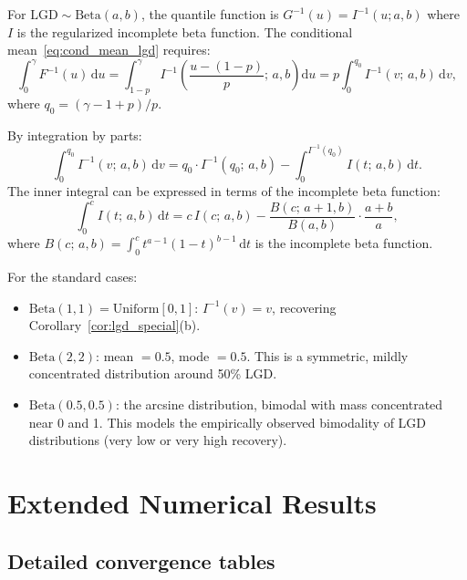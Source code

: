 \documentclass[11pt]{article}
\theoremstyle{definition}
\newcommand{\dd}{\mathrm{d}}
\newcommand{\1}{\mathbf{1}}
\begin{document}
For $\mathrm{LGD} \sim \mathrm{Beta}(a,b)$, the quantile function is $G^{-1}(u) = I^{-1}(u; a, b)$ where $I$ is the regularized incomplete beta function. The conditional mean~\eqref{eq:cond_mean_lgd} requires:
\begin{equation}\label{eq:beta_integral}
  \int_0^\gamma F^{-1}(u)\,\dd u = \int_{1-p}^\gamma I^{-1}\!\left(\frac{u-(1-p)}{p};\, a, b\right)\dd u
  = p \int_0^{q_0} I^{-1}(v;\, a, b)\,\dd v,
\end{equation}
where $q_0 = (\gamma - 1 + p)/p$.

By integration by parts:
\begin{equation}\label{eq:beta_ibp}
  \int_0^{q_0} I^{-1}(v;\, a, b)\,\dd v = q_0 \cdot I^{-1}(q_0;\, a, b) - \int_0^{I^{-1}(q_0)} I(t;\, a, b)\,\dd t.
\end{equation}
The inner integral can be expressed in terms of the incomplete beta function:
\[
  \int_0^c I(t;\, a, b)\,\dd t = c\,I(c;\, a, b) - \frac{B(c;\, a+1, b)}{B(a,b)} \cdot \frac{a+b}{a},
\]
where $B(c;\, a, b) = \int_0^c t^{a-1}(1-t)^{b-1}\,\dd t$ is the incomplete beta function.

For the standard cases:
\begin{itemize}
  \item $\mathrm{Beta}(1,1) = \mathrm{Uniform}[0,1]$: $I^{-1}(v) = v$, recovering Corollary~\ref{cor:lgd_special}(b).
  \item $\mathrm{Beta}(2,2)$: mean $= 0.5$, mode $= 0.5$. This is a symmetric, mildly concentrated distribution around 50\% LGD.
  \item $\mathrm{Beta}(0.5, 0.5)$: the arcsine distribution, bimodal with mass concentrated near 0 and 1. This models the empirically observed bimodality of LGD distributions (very low or very high recovery).
\end{itemize}

\section{Extended Numerical Results}\label{app:numerics}

\subsection{Detailed convergence tables}
\end{document}
